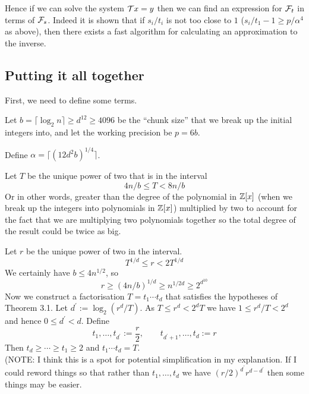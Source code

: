 Hence if we can solve the system $\mathcal Tx = y$ then we can find an expression for $\mathcal F_t$ in terms of $\mathcal F_s$. Indeed it is shown that if $s_i / t_i$ is not too close to $1$ ($s_i / t_1 - 1 \geq p/\alpha^4$ as above), then there exists a fast algorithm for calculating an approximation to the inverse.

\subsection{Putting it all together}%
\label{sub:Putting it all together}

First, we need to define some terms.

Let $b = \lceil \log_2 n\rceil \geq d^{12} \geq 4096$ be the ``chunk size'' that we break up the initial integers into, and let the working precision be $p = 6b$.

Define $\alpha = \lceil (12d^2 b)^{1/4}\rceil$.





Let $T$ be the unique power of two that is in the interval
\begin{equation}
    4n/b \leq T < 8n/b
\end{equation}
Or in other words, greater than the degree of the polynomial in ${\mathbb Z}[x]$ (when we break up the integers into polynomials in ${\mathbb Z}[x]$) multiplied by two to account for the fact that we are multiplying two polynomials together so the total degree of the result could be twice as big.

Let $r$ be the unique power of two in the interval.
\[
    T^{1/d} \leq r < 2T^{1/d}
\]
We certainly have $b \leq 4n^{1/2}$, so
\[
    r \geq (4n/b)^{1/d} \geq n^{1/2d} \geq 2^{d^{10}}
\]
Now we construct a factorisation $T = t_1 \cdots t_d$ that satisfies the hypotheses of Theorem 3.1. Let $d^\prime := \log_2(r^d / T)$. As $T \leq r^d < 2^d T$ we have $1 \leq r^d / T < 2^d$ and hence $0 \leq d^\prime < d$. Define
\[
    t_1, \ldots, t_{d^\prime} := \frac{r}{2}, \qquad t_{d^\prime + 1} , \ldots, t_d := r
\]
Then $t_d \geq \cdots \geq t_1 \geq 2$ and $t_1\cdots t_d = T$.\\
(NOTE: I think this is a spot for potential simplification in my explanation. If I could reword things so that rather than $t_1, \ldots, t_d$ we have $(r/2)^{d^\prime} r^{d-d^\prime}$ then some things may be easier.

